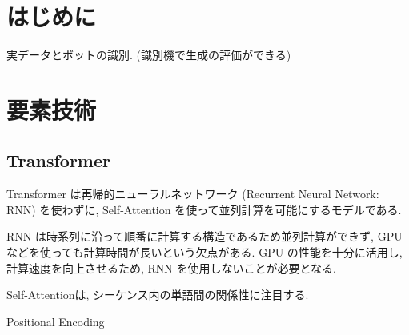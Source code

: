 \documentclass[twocolumn]{jarticle}     %
\begin{document}


\section{はじめに}

実データとボットの識別.
(識別機で生成の評価ができる)

\section{要素技術}
\subsection{Transformer}
Transformer\cite{DBLP:journals/corr/VaswaniSPUJGKP17} は再帰的ニューラルネットワーク (Recurrent Neural Network: RNN)\cite{mikolov2010recurrent} を使わずに, Self-Attention を使って並列計算を可能にするモデルである.

RNN は時系列に沿って順番に計算する構造であるため並列計算ができず,
GPU などを使っても計算時間が長いという欠点がある.
GPU の性能を十分に活用し, 計算速度を向上させるため, RNN を使用しないことが必要となる.

Self-Attentionは, シーケンス内の単語間の関係性に注目する.

Positional Encoding
\end{document}
